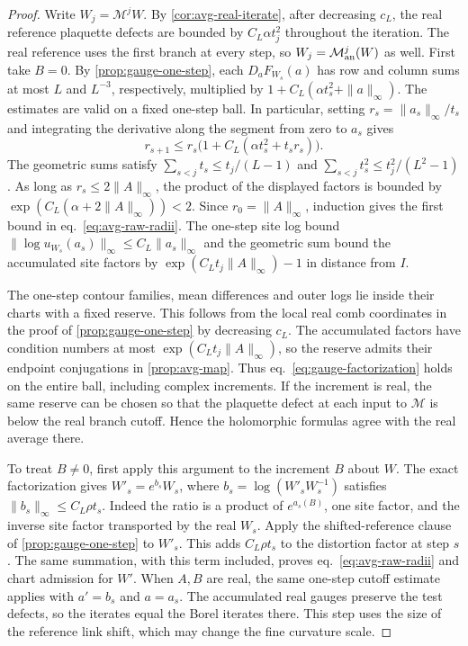 \documentclass[11pt,letterpaper,reqno]{amsart}
\numberwithin{equation}{section}
\renewcommand{\eqref}[1]{\textup{eq.~\ref{#1}}}
\theoremstyle{definition}
\theoremstyle{remark}
\begin{document}
\begin{proof}
Write \(W_j=\mathcal M^j W\). By \cref{cor:avg-real-iterate},
after decreasing \(c_L\), the real reference plaquette defects
are bounded by \(C_L\alpha t_j^2\) throughout the iteration.
The real reference uses the first branch at every step, so
\(W_j=\mathcal M_{\rm an}^j(W)\) as well. First take \(B=0\). By \cref{prop:gauge-one-step}, each
\(D_aF_{W_s}(a)\) has row and column sums at most \(L\) and
\(L^{-3}\), respectively, multiplied by
\(1+C_L(\alpha t_s^2+\|a\|_\infty)\). The estimates are valid
on a fixed one-step ball. In particular, setting
\(r_s=\|a_s\|_\infty/t_s\) and integrating the derivative along
the segment from zero to \(a_s\) gives
\[
 r_{s+1}\leq r_s\bigl(1+C_L(\alpha t_s^2+t_s r_s)\bigr).
\]
The geometric sums satisfy
\(\sum_{s<j} t_s\leq t_j/(L-1)\) and
\(\sum_{s<j}t_s^2\leq t_j^2/(L^2-1)\).
As long as \(r_s\leq 2\|A\|_\infty\), the product of the
displayed factors is bounded by
\(\exp(C_L(\alpha+2\|A\|_\infty))<2\).
Since \(r_0=\|A\|_\infty\), induction gives the first
bound in \eqref{eq:avg-raw-radii}. The one-step site log
bound \(\|\log u_{W_s}(a_s)\|_\infty\leq C_L\|a_s\|_\infty\)
and the geometric sum bound the accumulated site factors by
\(\exp(C_Lt_j\|A\|_\infty)-1\) in distance from \(I\).

The one-step contour families, mean differences and outer logs
lie inside their charts with a fixed reserve. This follows from
the local real comb coordinates in the proof of
\cref{prop:gauge-one-step} by decreasing \(c_L\).
The accumulated factors have condition numbers at most
\(\exp(C_Lt_j\|A\|_\infty)\), so the reserve admits their
endpoint conjugations in \cref{prop:avg-map}. Thus
\eqref{eq:gauge-factorization} holds on the entire ball, including
complex increments. If the increment is real, the same reserve
can be chosen so that the plaquette defect at each input to
\(\mathcal M\) is below the real branch cutoff. Hence the
holomorphic formulas agree with the real average there.

To treat \(B\ne0\), first apply this argument to the increment
\(B\) about \(W\). The exact factorization gives
\(W'_s=e^{b_s}W_s\), where
\(b_s=\log(W'_sW_s^{-1})\) satisfies
\(\|b_s\|_\infty\leq C_L\rho t_s\). Indeed the ratio is a
product of \(e^{a_s(B)}\), one site factor, and the inverse
site factor transported by the real \(W_s\).
Apply the shifted-reference clause of \cref{prop:gauge-one-step}
to \(W'_s\). This adds \(C_L\rho t_s\) to the distortion factor
at step \(s\). The same summation, with this term included,
proves \eqref{eq:avg-raw-radii} and chart admission for \(W'\).
When \(A,B\) are real, the same one-step cutoff estimate applies
with \(a'=b_s\) and \(a=a_s\). The accumulated real gauges preserve
the test defects, so the iterates equal the Borel iterates there.
This step uses the size of the reference link shift, which may
change the fine curvature scale.


\end{proof}
\end{document}
